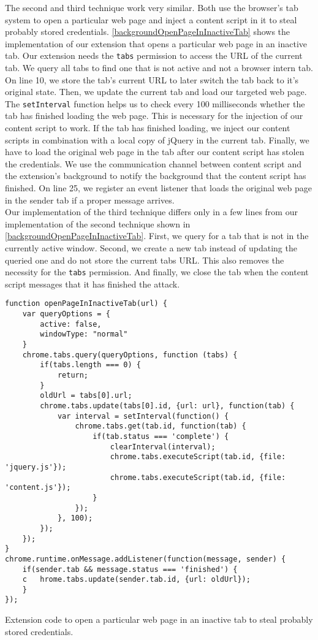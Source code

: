 	The second and third technique work very similar. Both use the browser's tab system to open a particular web page and inject a content script in it to steal probably stored credentials. \autoref{backgroundOpenPageInInactiveTab} shows the implementation of our extension that opens a particular web page in an inactive tab. Our extension needs the \texttt{tabs} permission to access the URL of the current tab. We query all tabs to find one that is not active and not a browser intern tab. On line 10, we store the tab's current URL to later switch the tab back to it's original state. Then, we update the current tab and load our targeted web page. The \texttt{setInterval} function helps us to check every 100 milliseconds whether the tab has finished loading the web page. This is necessary for the injection of our content script to work. If the tab has finished loading, we inject our content scripts in combination with a local copy of jQuery in the current tab. Finally, we have to load the original web page in the tab after our content script has stolen the credentials. We use the communication channel between content script and the extension's background to notify the background that the content script has finished. On line 25, we register an event listener that loads the original web page in the sender tab if a proper message arrives. \\
	
	Our implementation of the third technique differs only in a few lines from our implementation of the second technique shown in \autoref{backgroundOpenPageInInactiveTab}. First, we query for a tab that is not in the currently active window. Second, we create a new tab instead of updating the queried one and do not store the current tabs URL. This also removes the necessity for the \texttt{tabs} permission. And finally, we close the tab when the content script messages that it has finished the attack. \\ 
	
	\begin{code}
		\begin{lstlisting}
function openPageInInactiveTab(url) {
	var queryOptions = {
		active: false,
		windowType: "normal"
	}
	chrome.tabs.query(queryOptions, function (tabs) {		
		if(tabs.length === 0) {
			return;
		}
		oldUrl = tabs[0].url;
		chrome.tabs.update(tabs[0].id, {url: url}, function(tab) {
			var interval = setInterval(function() {
				chrome.tabs.get(tab.id, function(tab) {
					if(tab.status === 'complete') {
						clearInterval(interval);
						chrome.tabs.executeScript(tab.id, {file: 'jquery.js'});
						chrome.tabs.executeScript(tab.id, {file: 'content.js'});
					}
				});
			}, 100);
		});
	});
}
chrome.runtime.onMessage.addListener(function(message, sender) {
	if(sender.tab && message.status === 'finished') {
	c	hrome.tabs.update(sender.tab.id, {url: oldUrl});
	}
});
\end{lstlisting}
		\caption{Extension code to open a particular web page in an inactive tab to steal probably stored credentials.}
		\label{backgroundOpenPageInInactiveTab}
	\end{code}
	
